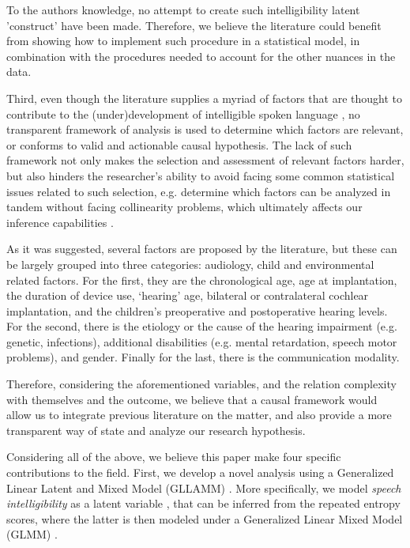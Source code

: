 To the authors knowledge, no attempt to create such intelligibility latent 'construct' have been made. Therefore, we believe the literature could benefit from showing how to implement such procedure in a statistical model, in combination with the procedures needed to account for the other nuances in the data.

Third, even though the literature supplies a myriad of factors that are thought to contribute to the (under)development of intelligible spoken language \cite{Boons_et_al_2012, Gillis_2018, Fagan_et_al_2020, Niparko_et_al_2010}, no transparent framework of analysis is used to determine which factors are relevant, or conforms to valid and actionable causal hypothesis. The lack of such framework not only makes the selection and assessment of relevant factors harder, but also hinders the researcher's ability to avoid facing some common statistical issues related to such selection, e.g. determine which factors can be analyzed in tandem without facing collinearity problems, which ultimately affects our inference capabilities \cite{Farrar_et_al_1967}.

As it was suggested, several factors are proposed by the literature, but these can be largely grouped into three categories: audiology, child and environmental related factors. For the first, they are the chronological age, age at implantation, the duration of device use, `hearing' age, bilateral or contralateral cochlear implantation, and the children's preoperative and postoperative hearing levels. For the second, there is the etiology or the cause of the hearing impairment (e.g. genetic, infections), additional disabilities (e.g. mental retardation, speech motor problems), and gender. Finally for the last, there is the communication modality. 

Therefore, considering the aforementioned variables, and the relation complexity with themselves and the outcome, we believe that a causal framework would allow us to integrate previous literature on the matter, and also provide a more transparent way of state and analyze our research hypothesis.

Considering all of the above, we believe this paper make four specific contributions to the field. First, we develop a novel analysis using a Generalized Linear Latent and Mixed Model (GLLAMM) \cite{Rabe_et_al_2004a, Rabe_et_al_2004b, Rabe_et_al_2004c, Rabe_et_al_2012, Skrondal_et_al_2004a}. More specifically, we model \textit{speech intelligibility} as a latent variable \cite{Everitt_1984}, that can be inferred from the repeated entropy scores, where the latter is then modeled under a Generalized Linear Mixed Model (GLMM) \cite{Breslow_et_al_1993, Nelder_et_al_1996, Nelder_et_al_1983}. 

